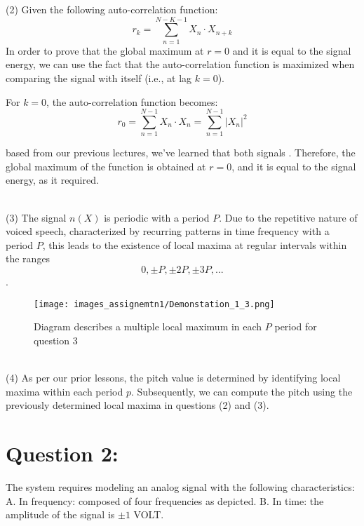\documentclass[letterpaper, 12pt]{article}
\begin{document}
\noindent\makebox[\linewidth]{\rule{\textwidth}{1pt}}

(2) Given the following auto-correlation function:
\[r_k = \sum_{n=1}^{N-K-1} X_n \cdot X_{n+k}\]
In order to prove that the global maximum at \(r = 0\) and it is equal to the signal energy, we can use the fact that the auto-correlation function is maximized when comparing the signal with itself (i.e., at lag \(k = 0\)).

For \(k = 0\), the auto-correlation function becomes:
\[ r_0 = \sum_{n=1}^{N-1} X_n \cdot X_n = \sum_{n=1}^{N-1} |X_n|^2 \]

based from our previous lectures, we've learned that both signals . Therefore, the global maximum of the function is obtained at \(r = 0\), and it is equal to the signal energy, as it required.

\noindent\makebox[\linewidth]{\rule{\textwidth}{1pt}} \\



(3) The signal \(n(X)\) is periodic with a period \(P\). Due to the repetitive nature of voiced speech, characterized by recurring patterns in time frequency with a period \(P\), this leads to the existence of local maxima at regular intervals within the ranges \[0, \pm P, \pm 2P, \pm 3P, ...\]. 

\begin{figure}[htbp]
    \centering
    \texttt{[image: images\_assignemtn1/Demonstation\_1\_3.png]}
    \caption{Diagram describes a multiple local maximum in each $P$ period for question 3}
    \label{fig:enter-label}
\end{figure}

\noindent\makebox[\linewidth]{\rule{\textwidth}{1pt}} \\

(4)  As per our prior lessons, the pitch value is determined by identifying local maxima within each period \(p\). Subsequently, we can compute the pitch using the previously determined local maxima in questions (2) and (3).

\newpage

\section*{Question 2:}
The system requires modeling an analog signal with the following characteristics:
A. In frequency: composed of four frequencies as depicted.
B. In time: the amplitude of the signal is \(\pm 1\) VOLT.
    
\end{document}
